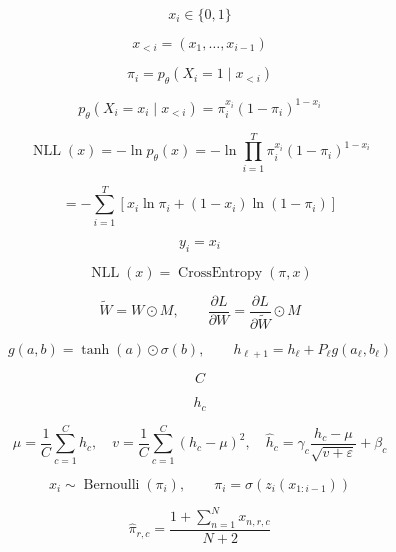 \[
x_i\in\{0,1\}
\]

\[
x_{<i}=(x_1,\ldots,x_{i-1})
\]

\[
\pi_i=p_\theta(X_i=1\mid x_{<i})
\]

\[
p_\theta(X_i=x_i\mid x_{<i})=\pi_i^{x_i}(1-\pi_i)^{1-x_i}
\]

\[
\operatorname{NLL}(x)=-\ln p_\theta(x)=-\ln\prod_{i=1}^{T}{\pi_i^{x_i}(1-\pi_i)^{1-x_i}}
\]

\[
=-\sum_{i=1}^{T}{[x_i\ln\pi_i+(1-x_i)\ln(1-\pi_i)]}
\]

\[
y_i=x_i
\]

\[
\operatorname{NLL}(x)=\operatorname{CrossEntropy}(\pi,x)
\]

\[
\widetilde W=W\odot M,\qquad \frac{\partial L}{\partial W}=\frac{\partial L}{\partial\widetilde W}\odot M
\]

\[
g(a,b)=\tanh(a)\odot\sigma(b),\qquad h_{\ell+1}=h_\ell+P_\ell g(a_\ell,b_\ell)
\]

\[
C
\]

\[
h_c
\]

\[
\mu=\frac{1}{C}\sum_{c=1}^{C}{h_c},\quad v=\frac{1}{C}\sum_{c=1}^{C}{(h_c-\mu)^2},\quad \widehat h_c=\gamma_c\frac{h_c-\mu}{\sqrt{v+\varepsilon}}+\beta_c
\]

\[
x_i\sim\operatorname{Bernoulli}(\pi_i),\qquad \pi_i=\sigma(z_i(x_{1:i-1}))
\]

\[
\widehat\pi_{r,c}=\frac{1+\sum_{n=1}^{N}{x_{n,r,c}}}{N+2}
\]
